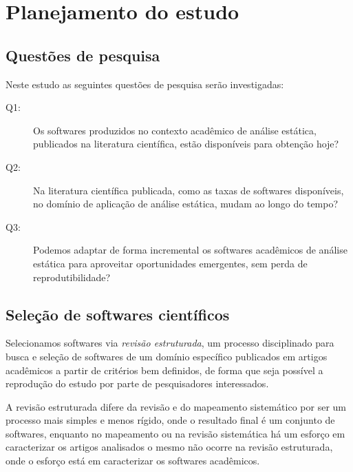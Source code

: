 \section{Planejamento do estudo}

\subsection{Questões de pesquisa}

Neste estudo as seguintes questões de pesquisa serão investigadas:

\newcommand{\QuestaoUm}{Os softwares produzidos no contexto acadêmico de
análise estática, publicados na literatura científica, estão disponíveis para
obtenção hoje?}

\newcommand{\QuestaoDois}{Na literatura científica publicada, como as taxas de
softwares disponíveis, no domínio de aplicação de análise estática, mudam ao
longo do tempo?}

\newcommand{\QuestaoTres}{Podemos adaptar de forma incremental os softwares
acadêmicos de análise estática para aproveitar oportunidades emergentes, sem
perda de reprodutibilidade?}

\begin{description}
  \item [Q1:] \QuestaoUm
  \item [Q2:] \QuestaoDois
  \item [Q3:] \QuestaoTres
\end{description}

\subsection{Seleção de softwares científicos}

Selecionamos softwares via {\it revisão estruturada}, um processo disciplinado
para busca e seleção de softwares de um domínio específico publicados em
artigos acadêmicos a partir de critérios bem definidos, de forma que seja
possível a reprodução do estudo por parte de pesquisadores interessados.

A revisão estruturada difere da revisão e do mapeamento sistemático
\cite{Kitchenham2007} por ser um processo mais simples e menos rígido, onde o
resultado final é um conjunto de softwares, enquanto no mapeamento ou na
revisão sistemática há um esforço em caracterizar os artigos analisados o mesmo
não ocorre na revisão estruturada, onde o esforço está em caracterizar os
softwares acadêmicos.


